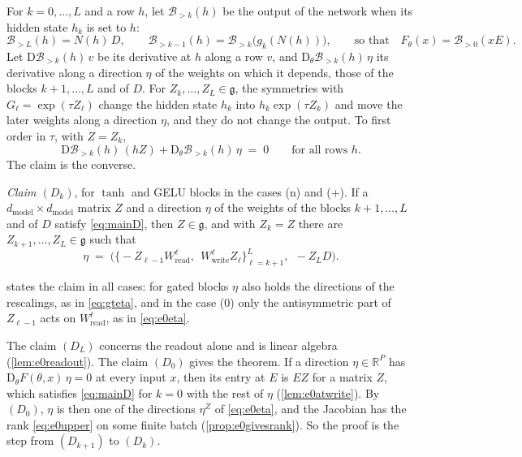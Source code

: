 \documentclass[10pt]{article}
\theoremstyle{definition}
\theoremstyle{remark}
\newcommand{\R}{\mathbb{R}}
\newcommand{\Wread}{W_{\mathrm{read}}}
\newcommand{\Wwrite}{W_{\mathrm{write}}}
\newcommand{\dm}{d_{\mathrm{model}}}
\newcommand{\Der}{\mathrm{D}}
\begin{document}
For $k = 0, \dots, L$ and a row $h$, let $\mathcal B_{>k}(h)$ be the output of the network when its hidden state $h_k$ is set to $h$:
\[
\mathcal B_{>L}(h) = N(h)\,D, \qquad \mathcal B_{>k-1}(h) = \mathcal B_{>k}\big(g_k(N(h))\big), \qquad\text{so that}\quad F_\theta(x) = \mathcal B_{>0}(xE).
\]
Let $\Der\mathcal B_{>k}(h)\,v$ be its derivative at $h$ along a row $v$, and $\Der_\theta\mathcal B_{>k}(h)\,\eta$ its derivative along a direction $\eta$ of the weights on which it depends, those of the blocks $k+1, \dots, L$ and of $D$. For $Z_k, \dots, Z_L \in \mathfrak g$, the symmetries with $G_\ell = \exp(\tau Z_\ell)$ change the hidden state $h_k$ into $h_k\exp(\tau Z_k)$ and move the later weights along a direction $\eta$, and they do not change the output. To first order in $\tau$, with $Z = Z_k$,
\begin{equation}\label{eq:mainD}
\Der\mathcal B_{>k}(h)\,(hZ) + \Der_\theta\mathcal B_{>k}(h)\,\eta \;=\; 0 \qquad\text{for all rows } h .
\end{equation}
The claim is the converse.

\smallskip
\noindent\emph{Claim $(D_k)$}, for $\tanh$ and GELU blocks in the cases (n) and (+). If a $\dm\times\dm$ matrix $Z$ and a direction $\eta$ of the weights of the blocks $k+1, \dots, L$ and of $D$ satisfy \eqref{eq:mainD}, then $Z \in \mathfrak g$, and with $Z_k = Z$ there are $Z_{k+1}, \dots, Z_L \in \mathfrak g$ such that
\[
\eta \;=\; \Big(\big\{-Z_{\ell-1}\Wread^{\ell},\ \ \Wwrite^{\ell}Z_\ell\big\}_{\ell=k+1}^{L},\ \ -Z_LD\Big).
\]
\smallskip

 states the claim in all cases: for gated blocks $\eta$ also holds the directions of the rescalings, as in \eqref{eq:gteta}, and in the case (0) only the antisymmetric part of $Z_{\ell-1}$ acts on $\Wread^{\ell}$, as in \eqref{eq:e0eta}.

The claim $(D_L)$ concerns the readout alone and is linear algebra (\cref{lem:e0readout}). The claim $(D_0)$ gives the theorem. If a direction $\eta \in \R^P$ has $\Der_\theta F(\theta, x)\,\eta = 0$ at every input $x$, then its entry at $E$ is $EZ$ for a matrix $Z$, which satisfies \eqref{eq:mainD} for $k = 0$ with the rest of $\eta$ (\cref{lem:e0atwrite}). By $(D_0)$, $\eta$ is then one of the directions $\eta^Z$ of \eqref{eq:e0eta}, and the Jacobian has the rank \eqref{eq:e0upper} on some finite batch (\cref{prop:e0givesrank}). So the proof is the step from $(D_{k+1})$ to $(D_k)$.
\end{document}
